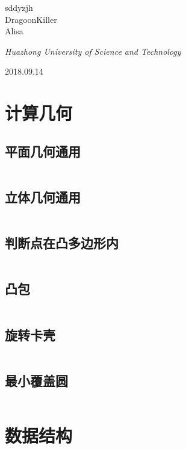 \documentclass[UTF8]{ctexart}
\begin{document}
\begin{titlepage}
	{\protect sddyzjh \\ DragoonKiller \\ Alisa \\} %
	
	\vspace{0.5\baselineskip} %
	
	\textit{Huazhong University of Science and Technology} %
	
	\vfill %
	
	
\date{\today}
	2018.09.14 %
	

\end{titlepage}
\setcounter{secnumdepth}{0}
\tableofcontents
\newpage
\section{计算几何}
\subsection{平面几何通用}
\inputminted{cpp}{calculategeometry/平面几何通用.cpp}
\subsection{立体几何通用}
\inputminted{cpp}{calculategeometry/立体几何通用.cpp}
\subsection{判断点在凸多边形内}
\inputminted{cpp}{calculategeometry/判断点在凸多边形内.cpp}
\subsection{凸包}
\inputminted{cpp}{calculategeometry/凸包.cpp}
\subsection{旋转卡壳}
\inputminted{cpp}{calculategeometry/旋转卡壳.cpp}
\subsection{最小覆盖圆}
\inputminted{cpp}{calculategeometry/最小覆盖圆.cpp}
\section{数据结构}
\end{document}
